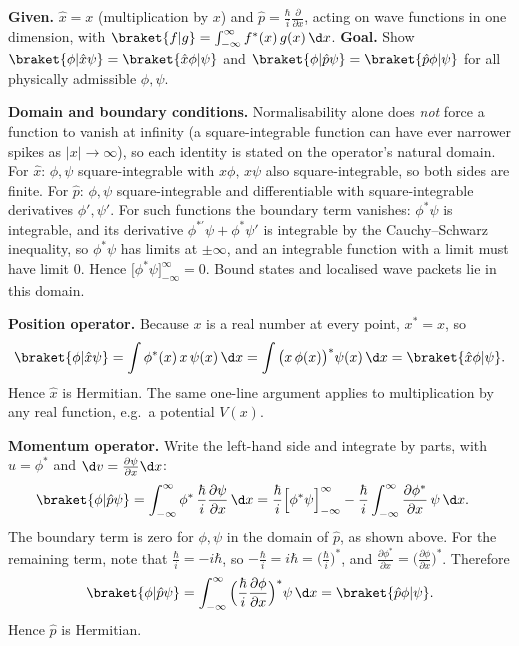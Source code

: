 \begin{solutionbox}
\textbf{Given.} $\hat x=x$ (multiplication by $x$) and $\hat p=\frac{\hbar}{i}\frac{\partial}{\partial x}$, acting on wave functions in one dimension, with $\braket{f|g}=\int_{-\infty}^{\infty}f^*(x)\,g(x)\,\d x$. \textbf{Goal.} Show $\braket{\phi|\hat x\psi}=\braket{\hat x\phi|\psi}$ and $\braket{\phi|\hat p\psi}=\braket{\hat p\phi|\psi}$ for all physically admissible $\phi,\psi$.

\textbf{Domain and boundary conditions.} Normalisability alone does \emph{not} force a function to vanish at infinity (a square-integrable function can have ever narrower spikes as $|x|\to\infty$), so each identity is stated on the operator's natural domain. For $\hat x$: $\phi,\psi$ square-integrable with $x\phi,\,x\psi$ also square-integrable, so both sides are finite. For $\hat p$: $\phi,\psi$ square-integrable and differentiable with square-integrable derivatives $\phi',\psi'$. For such functions the boundary term vanishes: $\phi^*\psi$ is integrable, and its derivative $\phi^{*\prime}\psi+\phi^*\psi'$ is integrable by the Cauchy--Schwarz inequality, so $\phi^*\psi$ has limits at $\pm\infty$, and an integrable function with a limit must have limit $0$. Hence $\big[\phi^*\psi\big]_{-\infty}^{\infty}=0$. Bound states and localised wave packets lie in this domain.

\textbf{Position operator.} Because $x$ is a real number at every point, $x^*=x$, so
\[
\braket{\phi|\hat x\psi}=\int\phi^*(x)\,x\,\psi(x)\,\d x=\int\big(x\,\phi(x)\big)^*\psi(x)\,\d x=\braket{\hat x\phi|\psi}.
\]
Hence $\hat x$ is Hermitian. The same one-line argument applies to multiplication by any real function, e.g.\ a potential $V(x)$.

\textbf{Momentum operator.} Write the left-hand side and integrate by parts, with $u=\phi^*$ and $\d v=\frac{\partial\psi}{\partial x}\d x$:
\begin{align*}
\braket{\phi|\hat p\psi}
&=\int_{-\infty}^{\infty}\phi^*\,\frac{\hbar}{i}\frac{\partial\psi}{\partial x}\,\d x
=\frac{\hbar}{i}\Big[\phi^*\psi\Big]_{-\infty}^{\infty}-\frac{\hbar}{i}\int_{-\infty}^{\infty}\frac{\partial\phi^*}{\partial x}\,\psi\,\d x .
\end{align*}
The boundary term is zero for $\phi,\psi$ in the domain of $\hat p$, as shown above. For the remaining term, note that $\frac{\hbar}{i}=-i\hbar$, so $-\frac{\hbar}{i}=i\hbar=\big(\frac{\hbar}{i}\big)^*$, and $\frac{\partial\phi^*}{\partial x}=\big(\frac{\partial\phi}{\partial x}\big)^*$. Therefore
\[
\braket{\phi|\hat p\psi}=\int_{-\infty}^{\infty}\Big(\frac{\hbar}{i}\frac{\partial\phi}{\partial x}\Big)^*\psi\,\d x=\braket{\hat p\phi|\psi}.
\]
Hence $\hat p$ is Hermitian.


\end{solutionbox}
